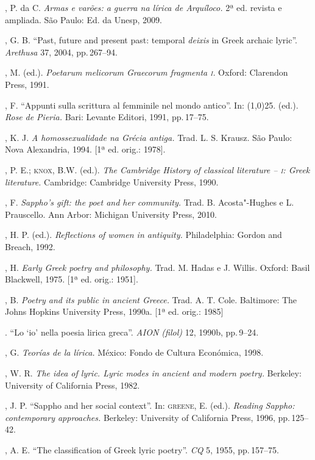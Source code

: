 \begin{bibliohedra}
, P. da C. \textit{Armas e varões: a guerra na
lírica de Arquíloco.} 2ª ed. revista e ampliada. São Paulo: Ed. da Unesp, 2009.

, G. B. “Past, future and present past: temporal
\textit{deixis} in Greek archaic lyric”. \textit{Arethusa} 37, 2004, pp.\,267--94.

, M. (ed.). \textit{Poetarum melicorum Graecorum fragmenta \textsc{i}.}
Oxford: Clarendon Press, 1991.

, F. “Appunti sulla scrittura al femminile nel mondo antico''.
In: \line(1,0){25}. (ed.). \textit{Rose} \textit{de Pieria.} Bari: Levante Editori,
1991, pp.\,17--75.

, K. J.  \textit{A homossexualidade na Grécia antiga.}
Trad. L. S. Krausz. São Paulo: Nova Alexandria, 1994. {[}1ª ed. orig.: 1978{]}.

, P. E.; \textsc{knox}, B.W. (ed.). \textit{The Cambridge History of
classical literature -- \textsc{i}: Greek literature.} Cambridge: Cambridge University
Press, 1990.

, F. \textit{Sappho’s gift: the poet and her community.} Trad.
B. Acosta"-Hughes e L. Prauscello. Ann Arbor: Michigan University Press, 2010.

, H. P. (ed.). \textit{Reflections of women in antiquity.}
Philadelphia: Gordon and Breach, 1992.

, H. \textit{Early Greek poetry and philosophy.} Trad. M. Hadas
e J. Willis. Oxford: Basil Blackwell, 1975. {[}1ª ed. orig.: 1951{]}. 

, B. \textit{Poetry and its public in ancient Greece.} Trad. A.
T. Cole. Baltimore: The Johns Hopkins University Press, 1990a.
{[}1ª ed. orig.: 1985{]}

\titidem. “Lo ‘io’ nella poesia lirica greca”. \textit{AION (filol)} 12,
1990b, pp.\,9--24.

, G. \textit{Teorías de la lírica.} México: Fondo de
Cultura Económica, 1998.

, W. R. \textit{The idea of lyric. Lyric modes in ancient and
modern poetry.} Berkeley: University of California Press, 1982.

, J. P. “Sappho and her social context”. In: \textsc{greene}, E.
(ed.). \textit{Reading Sappho: contemporary approaches.} Berkeley: University
of California Press, 1996, pp.\,125--42.

, A. E. “The classification of Greek lyric poetry”. \textit{CQ}
5, 1955, pp.\,157--75.


\end{bibliohedra}
